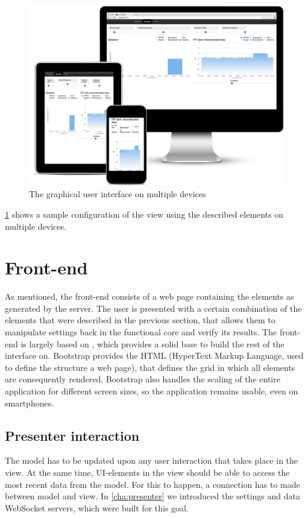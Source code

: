 \documentclass[a4paper, openany, oneside]{memoir}
\begin{document}
\begin{figure}[H]
    \centering
    \includegraphics[width=\textwidth]{figures/multidevice.png}
    \caption{The graphical user interface on multiple devices}
    \label{fig:multidevice}
\end{figure}

\cref{fig:multidevice} shows a sample configuration of the view using the described elements on multiple devices.

\section{Front-end}
\label{sec:clientside}
As mentioned, the front-end consists of a web page containing the elements as generated by the server. The user is presented with a certain combination of the elements that were described in the previous section, that allows them to manipulate settings back in the functional core and verify its results. The front-end is largely based on , which provides a solid base to build the rest of the interface on. Bootstrap provides the HTML (HyperText Markup Language, used to define the structure a web page), that defines the grid in which all elements are consequently rendered. Bootstrap also handles the scaling of the entire application for different screen sizes, so the application remains usable, even on smartphones.

\subsection{Presenter interaction}
\label{sub:presenter_interaction}
The model has to be updated upon any user interaction that takes place in the view. At the same time, UI-elements in the view should be able to access the most recent data from the model. For this to happen, a connection has to made between model and view. In \cref{cha:presenter} we introduced the settings and data WebSocket servers, which were built for this goal.
\end{document}
